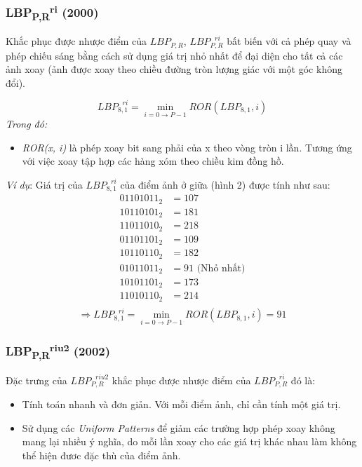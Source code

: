 \subsubsection{LBP\textsubscript{P,R}\textsuperscript{ri} (2000)}
Khắc phục được nhược điểm của $LBP_{P,R}$, $LBP_{P,R}^{\text{  }ri}$ bất biến với cả phép quay và phép chiếu sáng bằng cách sử dụng giá trị nhỏ nhất để đại diện cho tất cả các ảnh xoay (ảnh được xoay theo chiều đường tròn lượng giác với một góc không đổi).

\begin{equation}
	LBP_{8,1}^{\text{  }ri} = \min_{i=0 \to P-1}{ROR(LBP_{8,1}, i)}
\end{equation}
\textit{Trong đó:}
\begin{itemize}
	\item \textit{ROR(x, i)} là phép xoay bit sang phải của x theo vòng tròn i lần. Tương ứng với việc xoay tập hợp các hàng xóm theo chiều kim đồng hồ.
\end{itemize}

\textit{Ví dụ}: Giá trị của $LBP_{8,1}^{\text{  }ri}$ của điểm ảnh ở giữa (hình 2) được tính như sau:
\begin{align*}
	01101011_2 &= 107\\
	10110101_2 &= 181\\
	11011010_2 &= 218\\
	01101101_2 &= 109\\
	10110110_2 &= 182\\
	01011011_2 &= 91  \text{   (Nhỏ nhất)}\\
	10101101_2 &= 173\\
	11010110_2 &= 214\\
\end{align*}
$$
	\Longrightarrow LBP_{8,1}^{\text{  }ri} = \min_{i=0 \to P-1}{ROR(LBP_{8,1}, i)} = 91
$$
\subsubsection{LBP\textsubscript{P,R}\textsuperscript{riu2} (2002)}

Đặc trưng của $LBP_{P,R}^{\text{  }riu2}$ khắc phục được nhược điểm của $LBP_{P,R}^{\text{  }ri}$ đó là:
\begin{itemize}
	\item Tính toán nhanh và đơn giản. Với mỗi điểm ảnh, chỉ cần tính một giá trị.
	\item Sử dụng các \textit{Uniform Patterns} để  giảm các trường hợp phép xoay không mang lại nhiều ý nghĩa, do mỗi lần xoay cho các giá trị khác nhau làm không thể hiện đươc đặc thù của điểm ảnh.
\end{itemize}
\pagebreak


